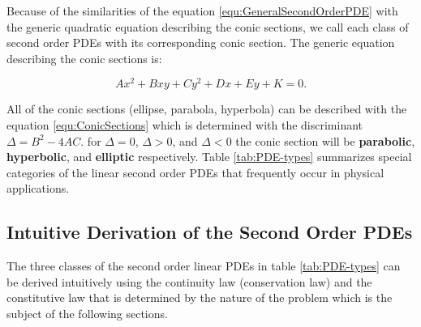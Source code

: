 Because of the similarities of the equation \ref{equ:GeneralSecondOrderPDE} with the generic quadratic equation describing the conic sections, we call each class of second order PDEs with its corresponding conic section. The generic equation describing the conic sections is:

\begin{equation}
	A x^2 + B x y + C y^2 + D x + E y + K = 0.
	\label{equ:ConicSections}
\end{equation}


All of the conic sections (ellipse, parabola, hyperbola) can be described with the equation \ref{equ:ConicSections} which is determined with the discriminant $ \Delta = B^2 - 4 A C $. for $ \Delta=0 $, $ \Delta > 0 $, and $ \Delta < 0 $ the conic section will be \textbf{parabolic}, \textbf{hyperbolic}, and \textbf{elliptic} respectively. Table \ref{tab:PDE-types} summarizes special categories of the linear second order PDEs that frequently occur in physical applications. \newline


\begin{table}[]
	\centering
	\caption{A summary of the three class of second order linear PDE.}
	\label{tab:PDE-types}
\end{table}


\subsection{Intuitive Derivation of the Second Order PDEs}
The three classes of the second order linear PDEs in table \ref{tab:PDE-types} can be derived intuitively using the continuity law (conservation law) and the constitutive law that is determined by the nature of the problem which is the subject of the following sections. 
 
